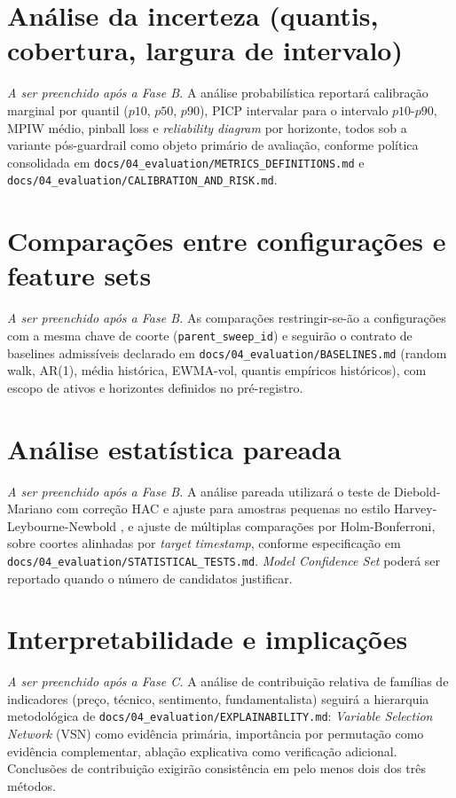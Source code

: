 \section{Análise da incerteza (quantis, cobertura, largura de intervalo)}
\textit{A ser preenchido após a Fase B.} A análise probabilística reportará calibração marginal por quantil (\(p10\), \(p50\), \(p90\)), PICP intervalar para o intervalo \(p10\)-\(p90\), MPIW médio, pinball loss e \textit{reliability diagram} por horizonte, todos sob a variante pós-guardrail como objeto primário de avaliação, conforme política consolidada em \texttt{docs/04\_evaluation/METRICS\_DEFINITIONS.md} e \texttt{docs/04\_evaluation/CALIBRATION\_AND\_RISK.md}.

\section{Comparações entre configurações e feature sets}
\textit{A ser preenchido após a Fase B.} As comparações restringir-se-ão a configurações com a mesma chave de coorte (\texttt{parent\_sweep\_id}) e seguirão o contrato de baselines admissíveis declarado em \texttt{docs/04\_evaluation/BASELINES.md} (random walk, AR(1), média histórica, EWMA-vol, quantis empíricos históricos), com escopo de ativos e horizontes definidos no pré-registro.

\section{Análise estatística pareada}
\textit{A ser preenchido após a Fase B.} A análise pareada utilizará o teste de Diebold-Mariano \cite{DIEBOLDMARIANO1995} com correção HAC e ajuste para amostras pequenas no estilo Harvey-Leybourne-Newbold \cite{HARVEY1997}, e ajuste de múltiplas comparações por Holm-Bonferroni, sobre coortes alinhadas por \textit{target timestamp}, conforme especificação em \texttt{docs/04\_evaluation/STATISTICAL\_TESTS.md}. \textit{Model Confidence Set} \cite{HANSEN2011MCS} poderá ser reportado quando o número de candidatos justificar.

\section{Interpretabilidade e implicações}
\textit{A ser preenchido após a Fase C.} A análise de contribuição relativa de famílias de indicadores (preço, técnico, sentimento, fundamentalista) seguirá a hierarquia metodológica de \texttt{docs/04\_evaluation/EXPLAINABILITY.md}: \textit{Variable Selection Network} (VSN) como evidência primária, importância por permutação como evidência complementar, ablação explicativa como verificação adicional. Conclusões de contribuição exigirão consistência em pelo menos dois dos três métodos.

